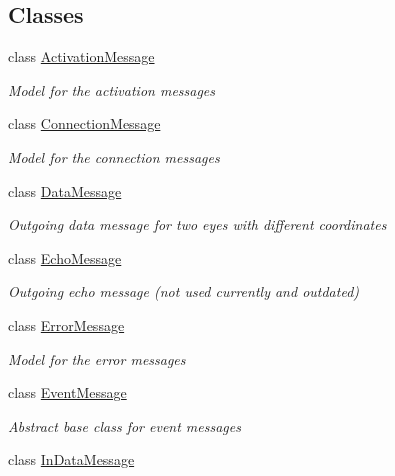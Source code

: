 \subsection*{Classes}
\begin{DoxyCompactItemize}
\item 
class \hyperlink{class_web_analyzer_1_1_models_1_1_message_model_1_1_activation_message}{Activation\+Message}
\begin{DoxyCompactList}\small\item\em Model for the activation messages \end{DoxyCompactList}\item 
class \hyperlink{class_web_analyzer_1_1_models_1_1_message_model_1_1_connection_message}{Connection\+Message}
\begin{DoxyCompactList}\small\item\em Model for the connection messages \end{DoxyCompactList}\item 
class \hyperlink{class_web_analyzer_1_1_models_1_1_message_model_1_1_data_message}{Data\+Message}
\begin{DoxyCompactList}\small\item\em Outgoing data message for two eyes with different coordinates \end{DoxyCompactList}\item 
class \hyperlink{class_web_analyzer_1_1_models_1_1_message_model_1_1_echo_message}{Echo\+Message}
\begin{DoxyCompactList}\small\item\em Outgoing echo message (not used currently and outdated) \end{DoxyCompactList}\item 
class \hyperlink{class_web_analyzer_1_1_models_1_1_message_model_1_1_error_message}{Error\+Message}
\begin{DoxyCompactList}\small\item\em Model for the error messages \end{DoxyCompactList}\item 
class \hyperlink{class_web_analyzer_1_1_models_1_1_message_model_1_1_event_message}{Event\+Message}
\begin{DoxyCompactList}\small\item\em Abstract base class for event messages \end{DoxyCompactList}\item 
class \hyperlink{class_web_analyzer_1_1_models_1_1_message_model_1_1_in_data_message}{In\+Data\+Message}

\end{DoxyCompactItemize}

